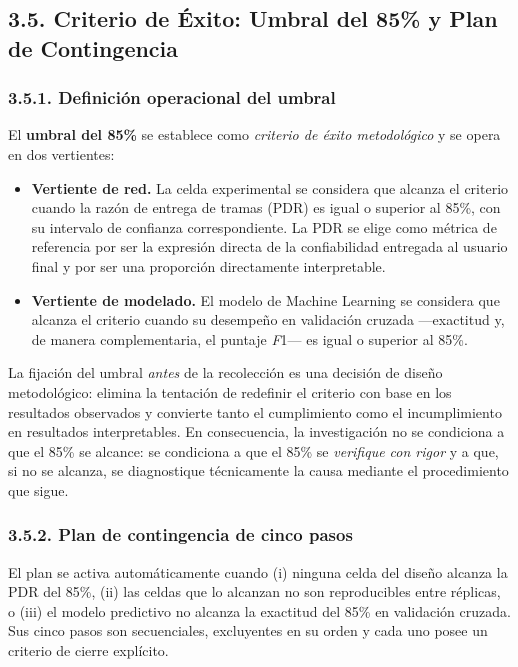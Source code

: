 \documentclass[
  12pt,
]{article}
\providecommand{\tightlist}{%
  \setlength{\itemsep}{0pt}\setlength{\parskip}{0pt}}
\begin{document}
\subsection{3.5. Criterio de Éxito: Umbral del 85\% y Plan de
Contingencia}\label{criterio-de-uxe9xito-umbral-del-85-y-plan-de-contingencia}

\subsubsection{3.5.1. Definición operacional del
umbral}\label{definiciuxf3n-operacional-del-umbral}

El \textbf{umbral del 85\%} se establece como \emph{criterio de éxito
metodológico} y se opera en dos vertientes:

\begin{itemize}
\tightlist
\item
  \textbf{Vertiente de red.} La celda experimental se considera que
  alcanza el criterio cuando la razón de entrega de tramas (PDR) es
  igual o superior al 85\%, con su intervalo de confianza
  correspondiente. La PDR se elige como métrica de referencia por ser la
  expresión directa de la confiabilidad entregada al usuario final y por
  ser una proporción directamente interpretable.
\item
  \textbf{Vertiente de modelado.} El modelo de Machine Learning se
  considera que alcanza el criterio cuando su desempeño en validación
  cruzada —exactitud y, de manera complementaria, el puntaje \emph{F}1—
  es igual o superior al 85\%.
\end{itemize}

La fijación del umbral \emph{antes} de la recolección es una decisión de
diseño metodológico: elimina la tentación de redefinir el criterio con
base en los resultados observados y convierte tanto el cumplimiento como
el incumplimiento en resultados interpretables. En consecuencia, la
investigación no se condiciona a que el 85\% se alcance: se condiciona a
que el 85\% se \emph{verifique con rigor} y a que, si no se alcanza, se
diagnostique técnicamente la causa mediante el procedimiento que sigue.

\subsubsection{3.5.2. Plan de contingencia de cinco
pasos}\label{plan-de-contingencia-de-cinco-pasos}

El plan se activa automáticamente cuando (i) ninguna celda del diseño
alcanza la PDR del 85\%, (ii) las celdas que lo alcanzan no son
reproducibles entre réplicas, o (iii) el modelo predictivo no alcanza la
exactitud del 85\% en validación cruzada. Sus cinco pasos son
secuenciales, excluyentes en su orden y cada uno posee un criterio de
cierre explícito.
\end{document}
